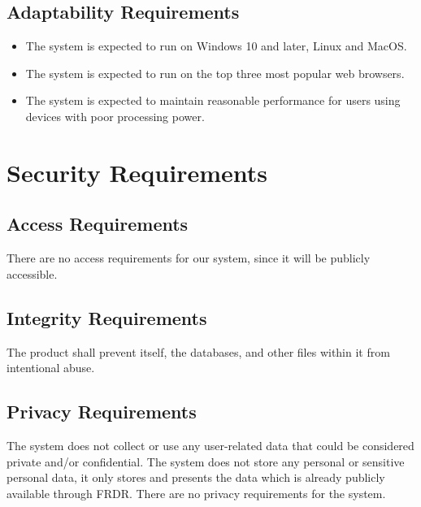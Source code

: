 \documentclass[12pt]{article}
\begin{document}
\subsection{Adaptability Requirements}

\begin{itemize}
    \item The system is expected to run on Windows 10 and later, Linux and MacOS.
    \item The system is expected to run on the top three most popular web browsers.
    \item The system is expected to maintain reasonable performance for users using devices
    with poor processing power. 

\end{itemize}

\section{Security Requirements}
\subsection{Access Requirements}

\par{There are no access requirements for our system, since it will be publicly accessible.}

\subsection{Integrity Requirements}

\par{The product shall prevent itself, the databases, and other files within it from intentional abuse.}

\subsection{Privacy Requirements}

\par{The system does not collect or use any user-related data that could be considered private and/or confidential. \newline \indent
The system does not store any personal or sensitive personal data, it only stores and presents the data which is already 
publicly available through FRDR. \newline \indent There are no privacy requirements for the system.}
\end{document}
